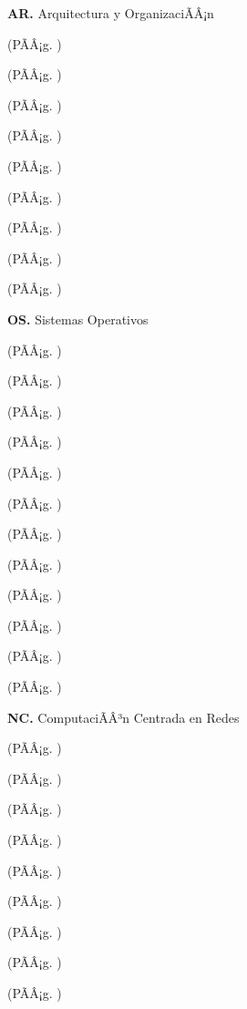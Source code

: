 	\textbf{AR.}  Arquitectura y OrganizaciÃÂ¡n%
	\begin{list}{}{%
		\setlength{\labelwidth}{0pt}%
		\setlength{\leftmargin}{15pt}}%
		\item \ARUNODef(PÃÂ¡g. \pageref{sec:BOK-AR1})
		\item \ARDOSDef(PÃÂ¡g. \pageref{sec:BOK-AR2})
		\item \ARTRESDef(PÃÂ¡g. \pageref{sec:BOK-AR3})
		\item \ARCUATRODef(PÃÂ¡g. \pageref{sec:BOK-AR4})
		\item \ARCINCODef(PÃÂ¡g. \pageref{sec:BOK-AR5})
		\item \ARSEISDef(PÃÂ¡g. \pageref{sec:BOK-AR6})
		\item \ARSIETEDef(PÃÂ¡g. \pageref{sec:BOK-AR7})
		\item \AROCHODef(PÃÂ¡g. \pageref{sec:BOK-AR8})
		\item \ARNUEVEDef(PÃÂ¡g. \pageref{sec:BOK-AR9})
	\end{list}%
	\textbf{OS.}  Sistemas Operativos%
	\begin{list}{}{%
		\setlength{\labelwidth}{0pt}%
		\setlength{\leftmargin}{15pt}}%
		\item \OSUNODef(PÃÂ¡g. \pageref{sec:BOK-OS1})
		\item \OSDOSDef(PÃÂ¡g. \pageref{sec:BOK-OS2})
		\item \OSTRESDef(PÃÂ¡g. \pageref{sec:BOK-OS3})
		\item \OSCUATRODef(PÃÂ¡g. \pageref{sec:BOK-OS4})
		\item \OSCINCODef(PÃÂ¡g. \pageref{sec:BOK-OS5})
		\item \OSSEISDef(PÃÂ¡g. \pageref{sec:BOK-OS6})
		\item \OSSIETEDef(PÃÂ¡g. \pageref{sec:BOK-OS7})
		\item \OSOCHODef(PÃÂ¡g. \pageref{sec:BOK-OS8})
		\item \OSNUEVEDef(PÃÂ¡g. \pageref{sec:BOK-OS9})
		\item \OSDIEZDef(PÃÂ¡g. \pageref{sec:BOK-OS10})
		\item \OSONCEDef(PÃÂ¡g. \pageref{sec:BOK-OS11})
		\item \OSDOCEDef(PÃÂ¡g. \pageref{sec:BOK-OS12})
	\end{list}%
	\textbf{NC.}  ComputaciÃÂ³n Centrada en Redes%
	\begin{list}{}{%
		\setlength{\labelwidth}{0pt}%
		\setlength{\leftmargin}{15pt}}%
		\item \NCUNODef(PÃÂ¡g. \pageref{sec:BOK-NC1})
		\item \NCDOSDef(PÃÂ¡g. \pageref{sec:BOK-NC2})
		\item \NCTRESDef(PÃÂ¡g. \pageref{sec:BOK-NC3})
		\item \NCCUATRODef(PÃÂ¡g. \pageref{sec:BOK-NC4})
		\item \NCCINCODef(PÃÂ¡g. \pageref{sec:BOK-NC5})
		\item \NCSEISDef(PÃÂ¡g. \pageref{sec:BOK-NC6})
		\item \NCSIETEDef(PÃÂ¡g. \pageref{sec:BOK-NC7})
		\item \NCOCHODef(PÃÂ¡g. \pageref{sec:BOK-NC8})
		\item \NCNUEVEDef(PÃÂ¡g. \pageref{sec:BOK-NC9})
	\end{list}%
